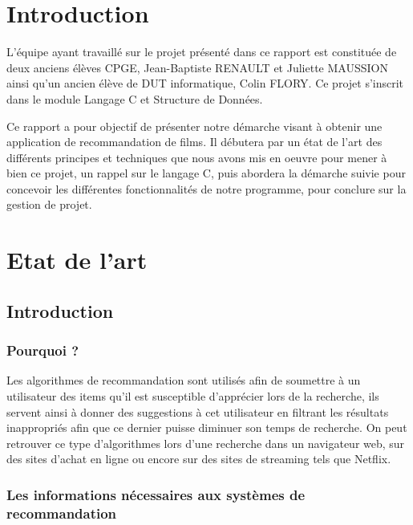 \documentclass{article}
\begin{document}
\newpage

\null\thispagestyle{empty}\newpage
\setcounter{page}{1}
\renewcommand{\contentsname}{Sommaire}
\tableofcontents
\newpage


\section*{Introduction}     \par L'équipe ayant travaillé sur le projet présenté dans ce rapport est constituée de deux anciens élèves CPGE, Jean-Baptiste RENAULT et Juliette MAUSSION ainsi qu'un ancien élève de DUT informatique, Colin FLORY. Ce projet s'inscrit dans le module Langage C et Structure de Données.
\par Ce rapport a pour objectif de présenter notre démarche visant à obtenir une application de recommandation de films. Il débutera par un état de l'art des différents principes et techniques que nous avons mis en oeuvre pour mener à bien ce projet, un rappel sur le langage C, puis abordera la démarche suivie pour concevoir les différentes fonctionnalités de notre programme, pour conclure sur la gestion de projet.
\newpage


\section{Etat de l'art}
\subsection{Introduction}

\subsubsection{Pourquoi ?}

Les algorithmes de recommandation sont utilisés afin de soumettre à un utilisateur des items qu'il est susceptible d'apprécier lors de la recherche, ils servent ainsi à donner des suggestions à cet utilisateur en filtrant les résultats inappropriés afin que ce dernier puisse diminuer son temps de recherche. On peut retrouver ce type d'algorithmes lors d'une recherche dans un navigateur web, sur des sites d'achat en ligne ou encore sur des sites de streaming tels que Netflix\cite{eda}.

\subsubsection{Les informations nécessaires aux systèmes de recommandation}
\end{document}
